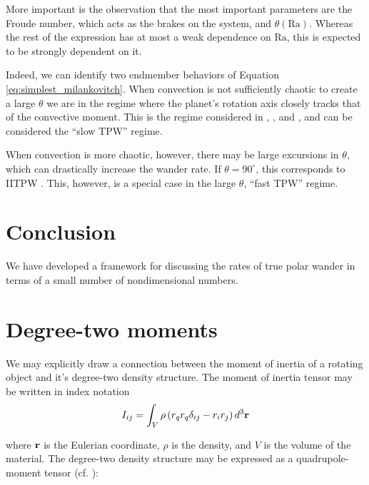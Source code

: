 \documentclass[extra,onecolumn]{gji}
\begin{document}
More important is the observation that the most important parameters are the Froude number, which acts as the brakes on the system, and $\theta(\mathrm{Ra})$.
Whereas the rest of the expression has at most a weak dependence on $\mathrm{Ra}$, this is expected to be strongly dependent on it.

Indeed, we can identify two endmember behaviors of Equation \ref{eq:simplest_milankovitch}.
When convection is not sufficiently chaotic to create a large $\theta$ we are in the regime where the planet's rotation axis closely tracks that of the convective moment.
This is the regime considered in \citet{steinberger1997changes}, \citet{roberts2007cause}, and \citet{zhong2007supercontinent}, and can be considered the ``slow TPW'' regime.

When convection is more chaotic, however, there may be large excursions in $\theta$, which can drastically increase the wander rate.  
If $\theta=90^\circ$, this corresponds to IITPW \citep{kirschvink1997evidence}.  
This, however, is a special case in the large $\theta$, ``fast TPW'' regime.



\section{Conclusion}
We have developed a framework for discussing the rates of true polar wander in terms of a small number of nondimensional numbers.


\begin{acknowledgments}
\end{acknowledgments}





\appendix

\section{Degree-two moments}
\label{appendix:moments}

We may explicitly draw a connection between the moment of inertia of a rotating object and it's degree-two density structure.  The moment of inertia tensor may be written in index notation
\begin{equation}
I_{ij} = \int_V \rho \left( r_q r_q \delta_{ij} - r_i r_j \right) d^3 {\bf r}
\label{inertia}
\end{equation}

where $\bf r$ is the Eulerian coordinate, $\rho$ is the density, and $V$ is the volume of the material.  The degree-two density structure may be expressed as a quadrupole-moment tensor (cf. \citet{jackson1998classical}):
\end{document}
